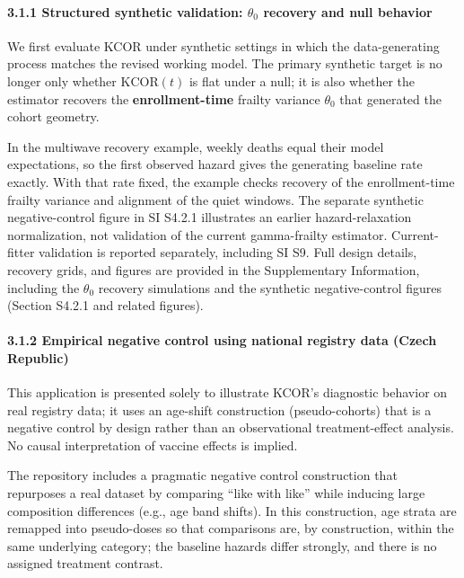 \documentclass[
]{article}
\begin{document}
\paragraph{\texorpdfstring{3.1.1 Structured synthetic validation: \(\theta_0\) recovery and null behavior}{3.1.1 Structured synthetic validation: \textbackslash theta\_0 recovery and null behavior}}\label{structured-synthetic-validation-theta_0-recovery-and-null-behavior}

We first evaluate KCOR under synthetic settings in which the data-generating process matches the revised working model. The primary synthetic target is no longer only whether \(\mathrm{KCOR}(t)\) is flat under a null; it is also whether the estimator recovers the \textbf{enrollment-time} frailty variance \(\theta_0\) that generated the cohort geometry.

In the multiwave recovery example, weekly deaths equal their model expectations, so the first observed hazard gives the generating baseline rate exactly. With that rate fixed, the example checks recovery of the enrollment-time frailty variance and alignment of the quiet windows. The separate synthetic negative-control figure in SI S4.2.1 illustrates an earlier hazard-relaxation normalization, not validation of the current gamma-frailty estimator. Current-fitter validation is reported separately, including SI S9. Full design details, recovery grids, and figures are provided in the Supplementary Information, including the \(\theta_0\) recovery simulations and the synthetic negative-control figures (Section S4.2.1 and related figures).

\paragraph{3.1.2 Empirical negative control using national registry data (Czech Republic)}\label{empirical-negative-control-using-national-registry-data-czech-republic}

This application is presented solely to illustrate KCOR's diagnostic behavior on real registry data; it uses an age-shift construction (pseudo-cohorts) that is a negative control by design rather than an observational treatment-effect analysis. No causal interpretation of vaccine effects is implied.

The repository includes a pragmatic negative control construction that repurposes a real dataset by comparing ``like with like'' while inducing large composition differences (e.g., age band shifts). In this construction, age strata are remapped into pseudo-doses so that comparisons are, by construction, within the same underlying category; the baseline hazards differ strongly, and there is no assigned treatment contrast.
\end{document}
